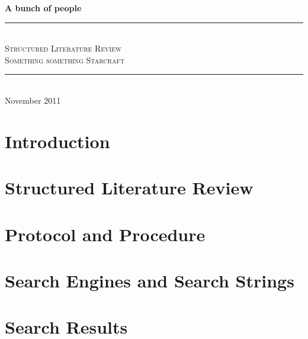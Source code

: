 \documentclass[11pt,a4paper,openany]{article}
\newcommand{\slrTitle}{Structured Literature Review}
\newcommand{\slrSubtitle}{Something something Starcraft}
\newcommand{\slrMadeby}{A bunch of people}
\newcommand{\slrDate}{November 2011}
\newcommand{\Hline}{\rule{\linewidth}{0.3mm} \\}
\begin{document}
\begin{titlepage}
\center
\large \textbf{\slrMadeby}

\vspace{3cm}
\Hline
\Huge \textsc{\slrTitle}
\vspace{2cm}
\huge \\ \textsc{\slrSubtitle}
\Hline
\vfill
\normalsize \slrDate

\end{titlepage}

\section{Introduction}


\section{Structured Literature Review}


\section{Protocol and Procedure}


\section{Search Engines and Search Strings}


\section{Search Results}


\label{biblio}
 
\end{document}

